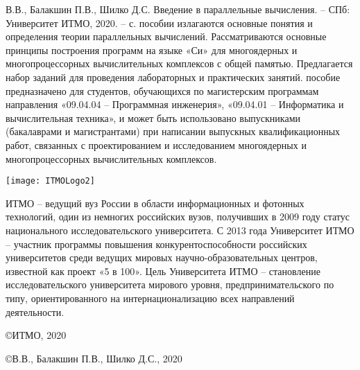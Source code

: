 { %
	\thispagestyle{empty} %
	 В.В., Балакшин П.В., Шилко Д.С. Введение в параллельные вычисления. -- СПб: Университет ИТМО, 2020. -- \pageref{LastPage} с.
	\newline
	\newline
	 пособии излагаются основные понятия и определения теории параллельных вычислений. Рассматриваются основные принципы построения программ на языке «Си» для многоядерных и многопроцессорных вычислительных комплексов с общей памятью. Предлагается набор заданий для проведения лабораторных и практических занятий.
	\newline
	\newline
	 пособие предназначено для студентов, обучающихся по магистерским программам направления «09.04.04 -- Программная инженерия», «09.04.01 -- Информатика и вычислительная техника», и может быть использовано выпускниками (бакалаврами и магистрантами) при написании выпускных квалификационных работ, связанных с проектированием и исследованием многоядерных и многопроцессорных вычислительных комплексов.
	\newline
	\newline
	\vspace*{\fill} %
	\begin{flushright}
		\texttt{[image: ITMOLogo2]}
	\end{flushright}
	 ИТМО – ведущий вуз России в области информационных и фотонных технологий, один из немногих российских вузов, получивших в 2009 году статус национального исследовательского университета. С 2013 года Университет ИТМО -- участник программы повышения конкурентоспособности российских университетов среди ведущих мировых научно-образовательных центров, известной как проект «5 в 100». Цель Университета ИТМО -- становление исследовательского университета мирового уровня, предпринимательского по типу, ориентированного на интернационализацию всех направлений деятельности.
	\begin{flushright}
		\copyright{} ИТМО, 2020
		\par\copyright{} В.В., Балакшин П.В., Шилко Д.С., 2020
	\end{flushright}
}
